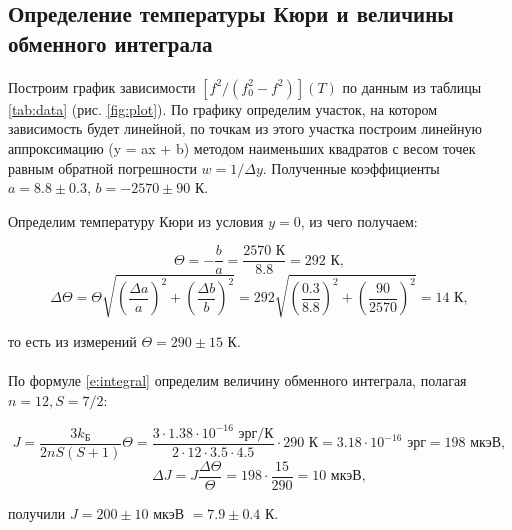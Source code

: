 \documentclass[a4paper,12pt]{article} %
\begin{document}
\subsection{Определение температуры Кюри и величины обменного интеграла}

\paragraph{}
	Построим график зависимости $[f^2 / (f_0^2 - f^2)](T)$ по данным из таблицы \ref{tab:data} (рис. \ref{fig:plot}). По графику определим участок, на котором зависимость будет линейной, по точкам из этого участка построим линейную аппроксимацию (y = ax + b) методом наименьших квадратов с весом точек равным обратной погрешности $w = 1 / \Delta y$. Полученные коэффициенты $a = 8.8 \pm 0.3$, $b = -2570 \pm 90$ К. 
	
	Определим температуру Кюри из условия $y = 0$, из чего получаем:
	
\[
\Theta = - \frac{b}{a} = \frac{2570 \text{ К}}{8.8} = 292 \text{ К},\]
\[
\Delta \Theta = \Theta \sqrt{\left( \frac{\Delta a}{a} \right)^2 + \left( \frac{\Delta b}{b} \right)^2} = 292 \sqrt{\left( \frac{0.3}{8.8} \right)^2 + \left( \frac{90}{2570} \right)^2} = 14 \text{ К},
\] 

\noindent то есть из измерений $\Theta = 290 \pm 15$ К.

\paragraph{}
	По формуле \eqref{e:integral} определим величину обменного интеграла, полагая $n = 12 , S = 7/2$:
	
\[
J = \frac{3 k_\text{Б}}{2nS(S + 1)} \Theta = \frac{3 \cdot 1.38 \cdot 10^{-16} \text{ эрг/К}}{2 \cdot 12 \cdot 3.5 \cdot 4.5} \cdot 290 \text{ К} = 3.18 \cdot 10^{-16} \text{ эрг} = 198 \text{ мкэВ},
\]\[
\Delta J = J \frac{\Delta \Theta}{\Theta} = 198 \cdot \frac{15}{290} = 10 \text{ мкэВ},
\]

\noindent получили $J = 200 \pm 10$ мкэВ $ = 7.9 \pm 0.4$ К.


	
	
\end{document}
